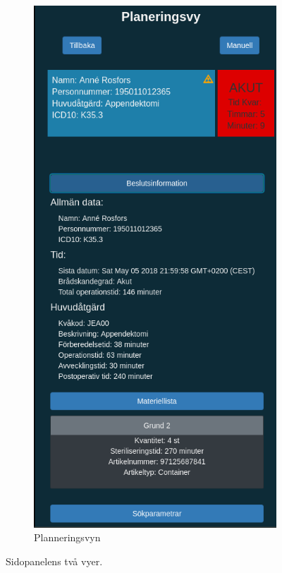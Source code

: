 \begin{figure}[H]
\begin{subfigure}[b]{0.4\linewidth}
	\end{subfigure}
	\begin{subfigure}[b]{0.4\linewidth}
		\includegraphics[width=\linewidth]{Figures/planning.png}
		\caption{Planneringsvyn}
		\label{fig:planeringsvy}
	\end{subfigure}
	\caption{Sidopanelens två vyer.}
	\label{fig:sidepanel}
\end{figure}


